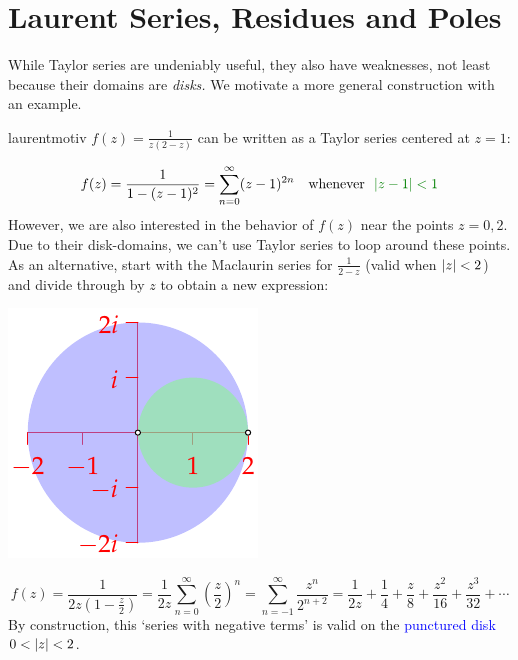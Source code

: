 \graphicspath{{6residues/asy/}}

\section{Laurent Series, Residues and Poles}\label{chap:residue}


While Taylor series are undeniably useful, they also have weaknesses, not least because their domains are \emph{disks.} We motivate a more general construction with an example.

\begin{example}{}{laurentmotiv}
	$f(z)=\frac 1{z(2-z)}$ can be written as a Taylor series centered at $z=1$:\par
	\begin{minipage}[t]{0.7\linewidth}\vspace{-10pt}
		\[
			f(z)=\frac 1{1-(z-1)^2} 
			=\sum_{n=0}^\infty (z-1)^{2n}
			\quad\text{whenever \ \textcolor{Green}{$\nm{z-1}<1$}}
		\]
		However, we are also interested in the behavior of $f(z)$ near the points $z=0,2$. Due to their disk-domains, we can't use Taylor series to loop around these points.\smallbreak
		As an alternative, start with the Maclaurin series for $\frac 1{2-z}$ (valid when $\left| z\right|<2$) and divide through by $z$ to obtain a new expression:
	\end{minipage}
	\hfill
	\begin{minipage}[t]{0.29\linewidth}\vspace{-10pt}
		\flushright\includegraphics[scale=0.95]{laurent}
	\end{minipage}\par\vspace{-2pt}
	\[
		f(z)=\frac 1{2z(1-\frac{z}{2})}
		=\frac 1{2z}\sum_{n=0}^\infty\left(\frac z2\right)^n 
		=\sum_{n=-1}^\infty\frac{z^n}{2^{n+2}} =\frac 1{2z}+\frac 14+\frac z8+\frac{z^2}{16}+\frac{z^3}{32}+\cdots	
	\]
	By construction, this `series with negative terms' is valid on the \textcolor{blue}{punctured disk $0<\left| z\right|<2$}.
\end{example}

